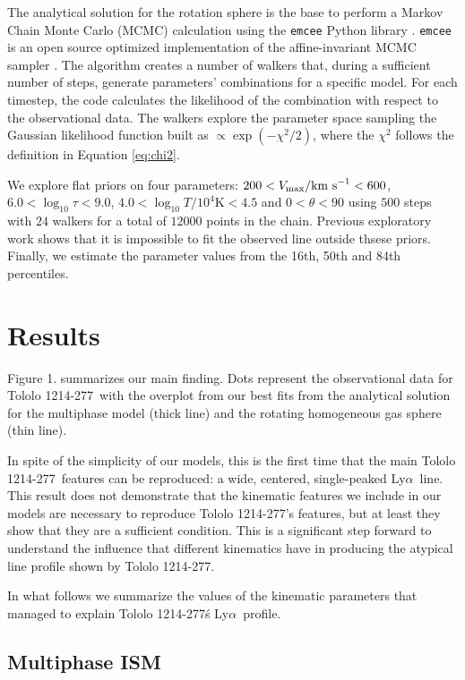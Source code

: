 \documentclass[a4,useAMS,usenatbib,usegraphicx]{mn2e}
\newcommand{\tol}{Tololo 1214-277}
\newcommand{\lya}{Ly$\alpha$}
\begin{document}
The analytical solution for the rotation sphere is the base to
perform a Markov Chain Monte Carlo (MCMC) calculation using the
\texttt{emcee} Python library \citep{2013PASP..125..306F}. \texttt{emcee} 
is an open source optimized implementation of the affine-invariant 
MCMC sampler \citep{goodman2010ensemble}. 
The algorithm creates a number of walkers that,
during a sufficient number of steps, generate parameters' combinations
for a specific model.
For each timestep, the code calculates the likelihood of the
combination with respect to the observational data.
The walkers explore the parameter space sampling the Gaussian likelihood
function built as $\propto \exp(-\chi^2/2)$, where the $\chi^2$ follows
the definition in Equation \ref{eq:chi2}. 
 

We explore flat priors on four parameters: $200<V_{\rm
  max}/\mathrm{km\ s}^{-1} <600$,   $6.0<\log_{10}\tau<9.0$,
$4.0<\log_{10} T/10^4\mathrm{K}< 4.5$ and $0<\theta<90$ using $500$
steps with $24$ walkers for a total of $12000$ points in the chain.
Previous exploratory work shows that it is impossible to fit the
observed line outside thsese priors.
Finally, we estimate the parameter values from the 16th, 50th and 84th
percentiles. 


\section{Results}


Figure 1. summarizes our main finding.
Dots represent the observational data for \tol\ with the
overplot from our best fits from the analytical solution for the
multiphase model (thick line)  and the rotating homogeneous gas sphere
(thin line). 

In spite of the simplicity of our models, this is the first time that
the main \tol\ features can be reproduced: a wide, centered,
single-peaked \lya\ line.
This result does not demonstrate that the kinematic features we
include in our models are necessary to reproduce \tol's features, but
at least they show that they are a sufficient condition.
This is a significant step forward to understand the influence that
different kinematics have in producing the atypical line profile shown
by \tol.

In what follows we summarize the values of the kinematic parameters
that managed to explain \tol\'s \lya\ profile.


\subsection{Multiphase ISM}
\end{document}
